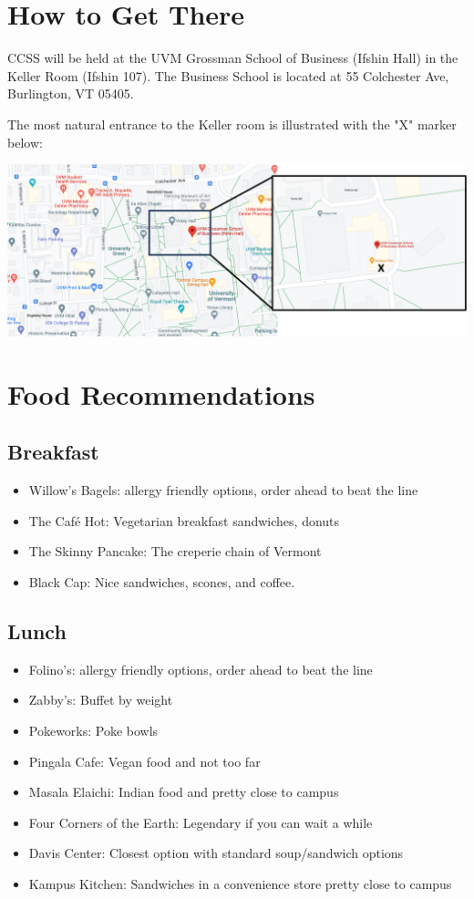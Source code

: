 \section{How to Get There}

CCSS will be held at the UVM Grossman School of Business (Ifshin Hall) in the Keller Room (Ifshin 107). The Business School is located at 55 Colchester Ave, Burlington, VT 05405.

The most natural entrance to the Keller room is illustrated with the "X" marker below:

\includegraphics[width=\textwidth]{images/map.png}


\section{Food Recommendations}

\subsection{Breakfast}

\begin{itemize}
    \item Willow's Bagels: allergy friendly options, order ahead to beat the line
    \item The Café Hot: Vegetarian breakfast sandwiches, donuts
    \item The Skinny Pancake: The creperie chain of Vermont
    \item Black Cap: Nice sandwiches, scones, and coffee.
\end{itemize}

\subsection{Lunch}

\begin{itemize}
    \item Folino's: allergy friendly options, order ahead to beat the line
    \item Zabby's: Buffet by weight
    \item Pokeworks: Poke bowls
    \item Pingala Cafe: Vegan food and not too far
    \item Masala Elaichi: Indian food and pretty close to campus
    \item Four Corners of the Earth: Legendary if you can wait a while
    \item Davis Center: Closest option with standard soup/sandwich options
    \item Kampus Kitchen: Sandwiches in a convenience store pretty close to campus
\end{itemize}

